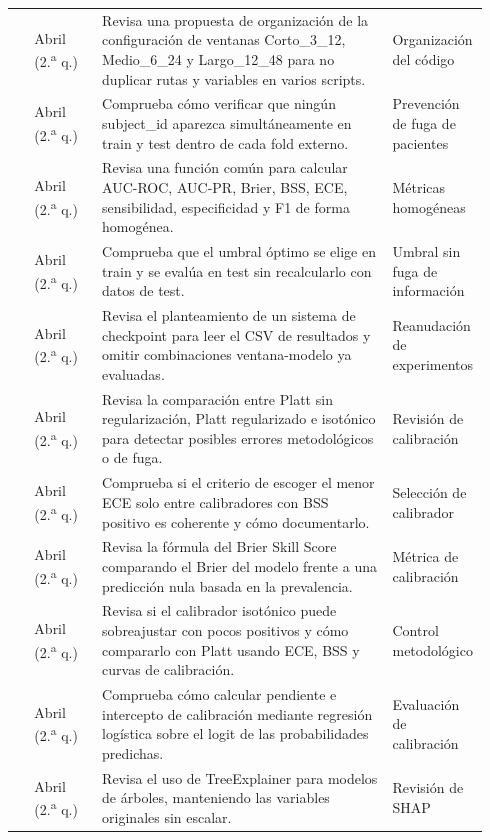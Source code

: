 \documentclass[
  spanish,
  a4paper,
  12pt,
  twoside]{memoir}
\begin{document}
{\begin{longtable*}{@{} p{0.04\linewidth} p{0.14\linewidth} p{0.60\linewidth} p{0.16\linewidth} @{}}
 & Abril (2.\textsuperscript{a} q.) & Revisa una propuesta de organización de la configuración de ventanas Corto\_3\_12, Medio\_6\_24 y Largo\_12\_48 para no duplicar rutas y variables en varios scripts. & Organización del código \\
 & Abril (2.\textsuperscript{a} q.) & Comprueba cómo verificar que ningún subject\_id aparezca simultáneamente en train y test dentro de cada fold externo. & Prevención de fuga de pacientes \\
 & Abril (2.\textsuperscript{a} q.) & Revisa una función común para calcular AUC-ROC, AUC-PR, Brier, BSS, ECE, sensibilidad, especificidad y F1 de forma homogénea. & Métricas homogéneas \\
 & Abril (2.\textsuperscript{a} q.) & Comprueba que el umbral óptimo se elige en train y se evalúa en test sin recalcularlo con datos de test. & Umbral sin fuga de información \\
 & Abril (2.\textsuperscript{a} q.) & Revisa el planteamiento de un sistema de checkpoint para leer el CSV de resultados y omitir combinaciones ventana-modelo ya evaluadas. & Reanudación de experimentos \\
 & Abril (2.\textsuperscript{a} q.) & Revisa la comparación entre Platt sin regularización, Platt regularizado e isotónico para detectar posibles errores metodológicos o de fuga. & Revisión de calibración \\
 & Abril (2.\textsuperscript{a} q.) & Comprueba si el criterio de escoger el menor ECE solo entre calibradores con BSS positivo es coherente y cómo documentarlo. & Selección de calibrador \\
 & Abril (2.\textsuperscript{a} q.) & Revisa la fórmula del Brier Skill Score comparando el Brier del modelo frente a una predicción nula basada en la prevalencia. & Métrica de calibración \\
 & Abril (2.\textsuperscript{a} q.) & Revisa si el calibrador isotónico puede sobreajustar con pocos positivos y cómo compararlo con Platt usando ECE, BSS y curvas de calibración. & Control metodológico \\
 & Abril (2.\textsuperscript{a} q.) & Comprueba cómo calcular pendiente e intercepto de calibración mediante regresión logística sobre el logit de las probabilidades predichas. & Evaluación de calibración \\
 & Abril (2.\textsuperscript{a} q.) & Revisa el uso de TreeExplainer para modelos de árboles, manteniendo las variables originales sin escalar. & Revisión de SHAP \\

\end{longtable*}}
\end{document}

